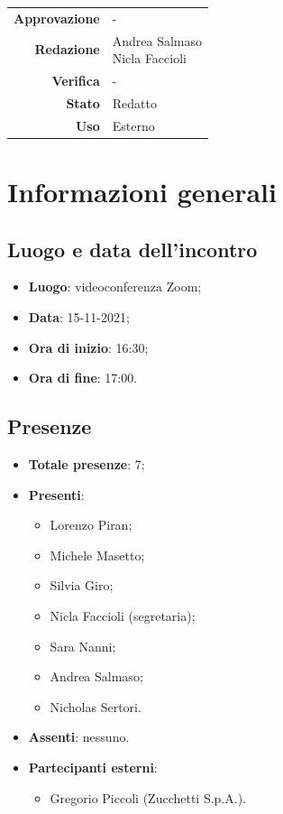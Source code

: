 \documentclass[11pt]{article}
\begin{document}
\begin{titlepage}
\begin{center}
			\large
			
			
			\vfill
			
			\begin{tabular}{r|l}
				\textbf{Approvazione} &  -\\
				\textbf{Redazione} &  \parbox[t]{3.5cm}{Andrea Salmaso \\Nicla Faccioli}\\
				\textbf{Verifica} &  -\\
				\textbf{Stato} & Redatto \\
				\textbf{Uso} & Esterno
			\end{tabular}
			\vfill
			
		\end{center}
	\end{titlepage}

	\newpage

	\section{Informazioni generali}
	\subsection{Luogo e data dell'incontro}
	\begin{itemize}
		\item \textbf{Luogo}: videoconferenza Zoom;
		\item \textbf{Data}: 15-11-2021;
		\item \textbf{Ora di inizio}: 16:30;
		\item \textbf{Ora di fine}: 17:00.
	\end{itemize}
	
	\subsection{Presenze}
	\begin{itemize}
		\item \textbf{Totale presenze}: 7;
		\item \textbf{Presenti}:
		\begin{itemize}
			\item Lorenzo Piran; 
			\item Michele Masetto;
			\item Silvia Giro;
			\item Nicla Faccioli (segretaria);
			\item Sara Nanni;
			\item Andrea Salmaso;
			\item Nicholas Sertori.
		\end{itemize}
		\item \textbf{Assenti}: nessuno.
		\item \textbf{Partecipanti esterni}: 
			\begin{itemize}
				\item Gregorio Piccoli (Zucchetti S.p.A.).
			\end{itemize}
	\end{itemize}
\end{document}
